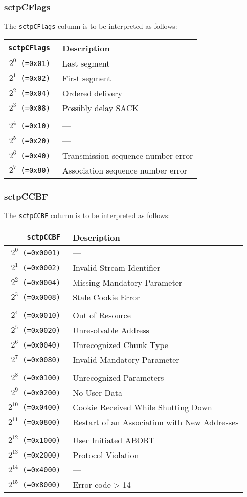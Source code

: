 \documentclass[documentation]{subfiles}
\begin{document}
\subsubsection{sctpCFlags}\label{sctpCFlags}
The {\tt sctpCFlags} column is to be interpreted as follows:
\begin{longtable}{>{\tt}rl}
    \toprule
    {\bf sctpCFlags}    & {\bf Description}\\
    \midrule\endhead%
    $2^0$ (=0x01) & Last segment\\
    $2^1$ (=0x02) & First segment\\
    $2^2$ (=0x04) & Ordered delivery\\
    $2^3$ (=0x08) & Possibly delay SACK\\
    \\
    $2^4$ (=0x10) & ---\\
    $2^5$ (=0x20) & ---\\
    $2^6$ (=0x40) & Transmission sequence number error\\
    $2^7$ (=0x80) & Association sequence number error\\
    \bottomrule
\end{longtable}

\subsubsection{sctpCCBF}\label{sctpCCBF}
The {\tt sctpCCBF} column is to be interpreted as follows:
\begin{longtable}{>{\tt}rl}
    \toprule
    {\bf sctpCCBF}    & {\bf Description}\\
    \midrule\endhead%
    $2^{0}$  (=0x0001) & ---\\
    $2^{1}$  (=0x0002) & Invalid Stream Identifier\\
    $2^{2}$  (=0x0004) & Missing Mandatory Parameter\\
    $2^{3}$  (=0x0008) & Stale Cookie Error\\
    \\
    $2^{4}$  (=0x0010) & Out of Resource\\
    $2^{5}$  (=0x0020) & Unresolvable Address\\
    $2^{6}$  (=0x0040) & Unrecognized Chunk Type\\
    $2^{7}$  (=0x0080) & Invalid Mandatory Parameter\\
    \\
    $2^{8}$  (=0x0100) & Unrecognized Parameters\\
    $2^{9}$  (=0x0200) & No User Data\\
    $2^{10}$ (=0x0400) & Cookie Received While Shutting Down\\
    $2^{11}$ (=0x0800) & Restart of an Association with New Addresses\\
    \\
    $2^{12}$ (=0x1000) & User Initiated ABORT\\
    $2^{13}$ (=0x2000) & Protocol Violation\\
    $2^{14}$ (=0x4000) & ---\\
    $2^{15}$ (=0x8000) & Error code > 14\\
    \bottomrule
\end{longtable}
\end{document}
